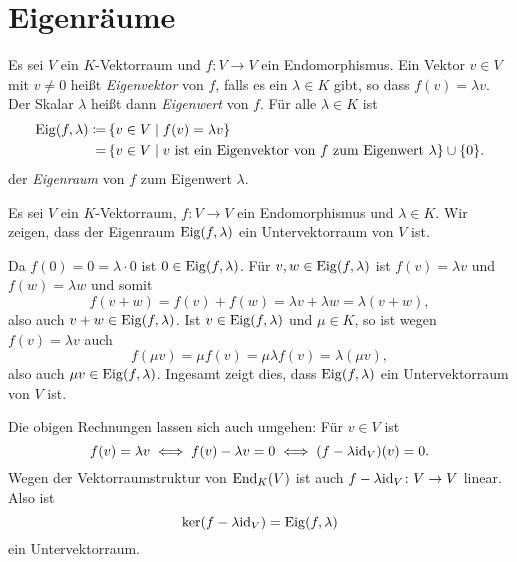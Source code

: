 \section{Eigenräume}
\begin{defi}
 Es sei $V$ ein $K$-Vektorraum und $f \colon V \to V$ ein Endomorphismus. Ein Vektor $v \in V$ mit $v \neq 0$ heißt \emph{Eigenvektor} von $f$, falls es ein $\lambda \in K$ gibt, so dass $f(v) = \lambda v$. Der Skalar $\lambda$ heißt dann \emph{Eigenwert} von $f$. Für alle $\lambda \in K$ ist
 \begin{align*}
  \mathrm{Eig}(f,\lambda)
  \coloneqq&\, \{v \in V \mid f(v) = \lambda v\} \\ 
  =&\, \{v \in V \mid \text{$v$ ist ein Eigenvektor von $f$ zum Eigenwert $\lambda$}\} \cup \{0\}.
 \end{align*}
 der \emph{Eigenraum} von $f$ zum Eigenwert $\lambda$.
\end{defi}

Es sei $V$ ein $K$-Vektorraum, $f \colon V \to V$ ein Endomorphismus und $\lambda \in K$. Wir zeigen, dass der Eigenraum $\mathrm{Eig}(f,\lambda)$ ein Untervektorraum von $V$ ist.

Da $f(0) = 0 = \lambda \cdot 0$ ist $0 \in \mathrm{Eig}(f,\lambda)$. Für $v,w \in \mathrm{Eig}(f,\lambda)$ ist $f(v) = \lambda v$ und $f(w) = \lambda w$ und somit
\[
 f(v+w)
 = f(v) + f(w)
 = \lambda v + \lambda w
 = \lambda (v+w),
\]
also auch $v+w \in \mathrm{Eig}(f,\lambda)$. Ist $v \in \mathrm{Eig}(f,\lambda)$ und $\mu \in K$, so ist wegen $f(v) = \lambda v$ auch
\[
 f(\mu v)
 = \mu f(v)
 = \mu \lambda f(v)
 = \lambda (\mu v),
\]
also auch $\mu v \in \mathrm{Eig}(f,\lambda)$. Ingesamt zeigt dies, dass $\mathrm{Eig}(f,\lambda)$ ein Untervektorraum von $V$ ist.

\begin{bem}
 Die obigen Rechnungen lassen sich auch umgehen: Für $v \in V$ ist
 \[
  f(v) = \lambda v
  \iff
  f(v) - \lambda v = 0
  \iff 
  (f - \lambda \mathrm{id}_V)(v) = 0.
 \]
 Wegen der Vektorraumstruktur von $\mathrm{End}_K(V)$ ist auch $f - \lambda \mathrm{id}_V \colon V \to V$ linear. Also ist
 \[
  \ker(f - \lambda \mathrm{id}_V) = \mathrm{Eig}(f,\lambda)
 \]
 ein Untervektorraum.
\end{bem}


